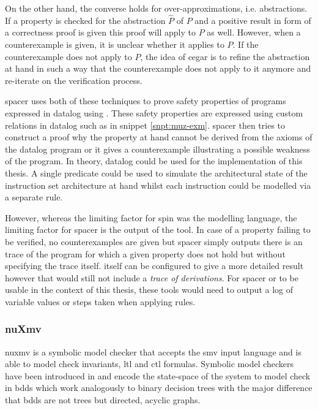 On the other hand, the converse holds for over-approximations, i.e. abstractions.
If a property is checked for the abstraction $ \hat{P} $ of $ P $ and a positive result in form of a correctness proof is given this proof will apply to $ P $ as well.
However, when a counterexample is given, it is unclear whether it applies to $ P $.
If the counterexample does not apply to $ P $, the idea of \gls{cegar} \cite{Clark00} is to refine the abstraction at hand in such a way that the counterexample does not apply to it anymore and re-iterate on the verification process.

\gls{spacer} uses both of these techniques to prove safety properties of programs expressed in \gls{datalog} using \muZ{}.
These safety properties are expressed using custom relations in \gls{datalog} such as  in snippet \ref{snpt:muz-exm}.
\gls{spacer} then tries to construct a proof why the property at hand cannot be derived from the axioms of the \gls{datalog} program or it gives a counterexample illustrating a possible weakness of the program.
In theory, \gls{datalog} could be used for the implementation of this thesis.
A single predicate could be used to simulate the architectural state of the instruction set architecture at hand whilst each instruction could be modelled via a separate rule.

However, whereas the limiting factor for \gls{spin} was the modelling language, the limiting factor for \gls{spacer} is the output of the tool.
In case of a property failing to be verified, no counterexamples are given but \gls{spacer} simply outputs there is an trace of the program for which a given property does not hold but without specifying the trace itself.
\muZ{} itself can be configured to give a more detailed result however that would still not include a \textit{trace of derivations}.
For \gls{spacer} or \muZ{} to be usable in the context of this thesis, these tools would need to output a log of variable values or steps taken when applying rules.

\subsubsection{nuXmv}

\gls{nuxmv} \cite{Cavada14} is a symbolic model checker that accepts the \gls{smv} input language and is able to model check invariants, \gls{ltl} and \gls{ctl} formulas.
Symbolic model checkers have been introduced in \cite{Burch92} and encode the state-space of the system to model check in \glspl{bdd} which work analogously to binary decision trees with the major difference that \glspl{bdd} are not trees but directed, acyclic graphs.

